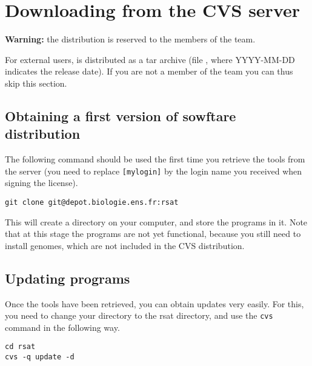 \section{Downloading \RSAT from the CVS server}

\textbf{Warning:} the  distribution is reserved to the
members of the \RSAT team. 

For external users, \RSAT is distributed as a tar archive (file
, where YYYY-MM-DD indicates the
release date). If you are not a member of the \RSAT team you can thus
skip this section.

\subsection{Obtaining a first version of \RSAT sowftare distribution}

The following command should be used the first time you retrieve the
tools from the server (you need to replace \texttt{[mylogin]} by the
login name you received when signing the \RSAT license).

\begin{lstlisting}
git clone git@depot.biologie.ens.fr:rsat
\end{lstlisting}


This will create a directory  on your computer, and
store the programs in it. Note that at this stage the programs are not
yet functional, because you still need to install genomes, which are
not included in the CVS distribution.

\subsection{Updating \RSAT programs}

Once the tools have been retrieved, you can obtain updates very
easily. For this, you need to change your directory to the rsat
directory, and use the \texttt{cvs} command in the following way.

\begin{lstlisting}
cd rsat
cvs -q update -d
\end{lstlisting}


